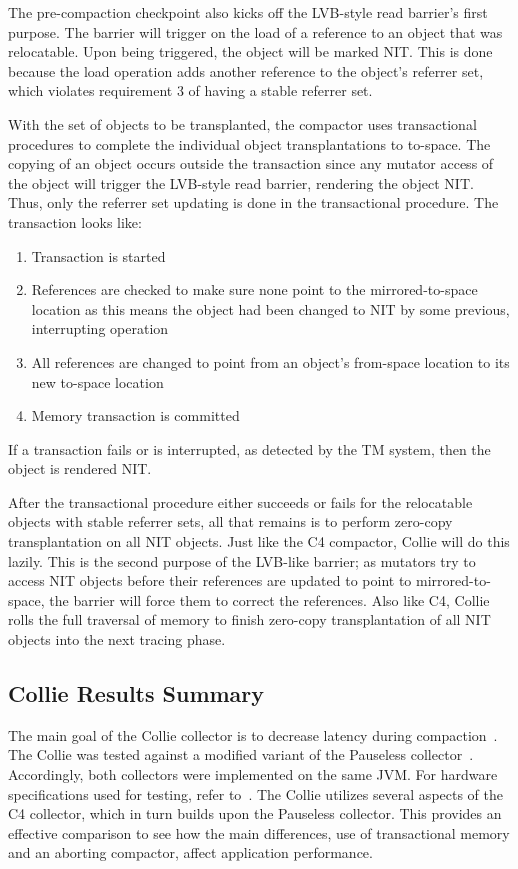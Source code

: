 \documentclass{sig-alternate}
\begin{document}
The pre-compaction checkpoint also kicks off the LVB-style read barrier's first purpose. 
The barrier will trigger on the load of a reference to an object that was 
relocatable. Upon being triggered, the object will be marked NIT. This is done because
the load operation adds another reference to the object's referrer set, which violates
requirement 3 of having a stable referrer set.

With the set of objects to be transplanted, the compactor uses transactional
procedures to complete the individual object transplantations to to-space.
The copying of an object occurs outside the transaction since any
mutator access of the object will trigger the LVB-style read barrier,
rendering the object NIT. Thus, only the referrer set updating
is done in the transactional procedure. The transaction looks like:
\begin{enumerate}
\item Transaction is started
\item References are checked to make sure none point to the mirrored-to-space location as this means the object had been changed to NIT by some previous, interrupting operation
\item All references are changed to point from an object's from-space location to its new to-space location
\item Memory transaction is committed
\end{enumerate}
If a transaction fails or is interrupted, as detected by the TM system, then the object is rendered NIT.

After the transactional procedure either succeeds or fails for the 
relocatable objects with stable referrer sets, all that remains is to perform zero-copy transplantation
on all NIT objects. Just like the C4 compactor, Collie will do this lazily. This is the second purpose
of the LVB-like barrier; as mutators try to access NIT objects before their references are updated to
point to mirrored-to-space, the barrier will force them to correct the references. Also like C4, Collie
rolls the full traversal of memory to finish zero-copy transplantation of all NIT objects into the next
tracing phase.


\subsection{Collie Results Summary}
\label{sec:collieResults}

The main goal of the Collie collector is to decrease latency
during compaction~\cite{Iyengar:Collie}. The Collie was tested 
against a modified variant of the Pauseless collector~\cite{Click:Pauseless}.
Accordingly, both collectors were implemented on the same JVM. For hardware
specifications used for testing, refer to~\cite{Iyengar:Collie}. The Collie
utilizes several aspects of the C4 collector, which in turn builds upon the Pauseless
collector. This provides an effective comparison to see how the main differences, 
use of transactional memory and an aborting compactor, affect application performance. 
\end{document}
